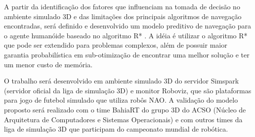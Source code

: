 \documentclass[font=plain]{abnt}
\begin{document}
A partir da identificação dos fatores que influenciam na tomada de decisão no ambiente simulado 3D e das limitações dos principais algoritmos 
de navegação encontradas, será definido e desenvolvido um modelo preditivo de navegação para o agente humanóide baseado 
no algoritmo R* \cite{plikhachev}. A idéia é utilizar o algoritmo R* que pode ser extendido para problemas complexos, além de possuir maior
garantia probabilística em sub-otimização de encontrar uma melhor solução e ter um menor custo de memória. 




O trabalho será desenvolvido em ambiente simulado 3D do servidor Simspark (servidor oficial da liga de simulação 3D) e monitor Roboviz,
que são plataformas para jogo de futebol simulado que utiliza robôs NAO. A validação do modelo proposto será realizado com o time 
BahiaRT do grupo 3D do ACSO (Núcleo de Arquitetura de Computadores e Sistemas Operacionais) e com outros times da liga de simulação 3D
que participam do campeonato mundial de robótica.

\end{document}
